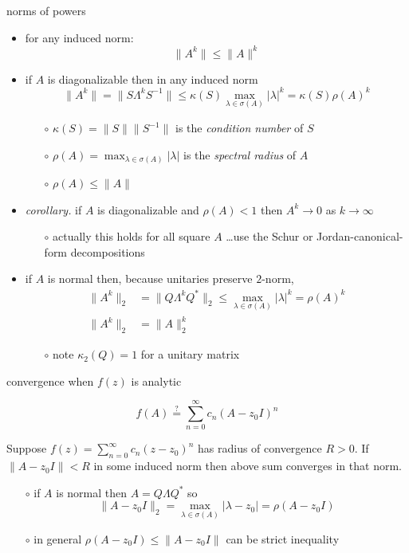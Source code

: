 \documentclass[10pt,hyperref]{beamer}
\begin{document}
\begin{frame}{norms of powers}

\begin{itemize}
\item for any induced norm:
    $$\|A^k\| \le \|A\|^k$$
\item if $A$ is diagonalizable then in any induced norm
    $$\|A^k\| = \|S\Lambda^k S^{-1}\| \le \kappa(S) \max_{\lambda\in\sigma(A)} |\lambda|^k = \kappa(S) \rho(A)^k$$

\vspace{-3mm}
    \begin{itemize}
    \item[$\circ$] $\kappa(S)=\|S\|\|S^{-1}\|$ is the \emph{condition number} of $S$
    \item[$\circ$] $\rho(A)=\max_{\lambda\in\sigma(A)} |\lambda|$ is the \emph{spectral radius} of $A$
    \item[$\circ$] $\rho(A)\le \|A\|$
    \end{itemize}
\item \emph{corollary.} if $A$ is diagonalizable and $\rho(A)<1$ then $A^k \to 0$ as $k\to\infty$
    \begin{itemize}
    \item[$\circ$] actually this holds for all square $A$ \dots use the Schur or Jordan-canonical-form decompositions
    \end{itemize}
\item if $A$ is normal then, because unitaries preserve $2$-norm,
\begin{align*}
\|A^k\|_2 &= \|Q\Lambda^k Q^*\|_2 \le \max_{\lambda\in\sigma(A)} |\lambda|^k = \rho(A)^k \\
\|A^k\|_2 &= \|A\|_2^k
\end{align*}

\vspace{-3mm}
    \begin{itemize}
    \item[$\circ$] note $\kappa_2(Q)=1$ for a unitary matrix
    \end{itemize}
\end{itemize}
\end{frame}


\begin{frame}{convergence when $f(z)$ is analytic}

   $$f(A) \stackrel{?}{=} \sum_{n=0}^\infty c_n (A-z_0 I)^n$$

\begin{lemma}
Suppose $f(z) = \sum_{n=0}^\infty c_n (z-z_0)^n$ has radius of convergence $R>0$. If $\|A-z_0 I\|<R$ in some induced norm then above sum converges in that norm.
\end{lemma}

    \begin{itemize}
    \item[$\circ$] if $A$ is normal then $A = Q \Lambda Q^*$ so
    $$\|A - z_0 I\|_2 = \max_{\lambda\in\sigma(A)} |\lambda-z_0| = \rho(A-z_0 I)$$
    \item[$\circ$] in general $\rho(A-z_0 I) \le \|A-z_0 I\|$ can be strict inequality
    \end{itemize}
\end{frame}
\end{document}
